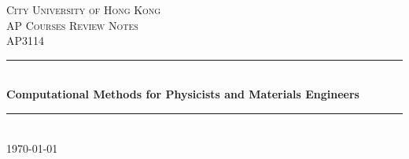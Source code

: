 \documentclass[openany]{book}
\begin{document}
\frontmatter
\begin{titlepage}
\newcommand{\HRule}{\rule{\linewidth}{0.5mm}} %

\center %


\textsc{\LARGE City University of Hong Kong}\\[1.5cm] %
\textsc{\Large AP Courses Review Notes}\\[0.5cm] 		%
\textsc{\large {AP3114}}\\[0.5cm] 						%


\HRule \\[0.4cm]
{ \huge \bfseries  \textsf{Computational Methods for Physicists and Materials Engineers} }\\[0.4cm] %
\HRule \\[1.5cm]







{\large \today}\\[2cm] %

\vspace{5cm}



\end{titlepage}
\end{document}
